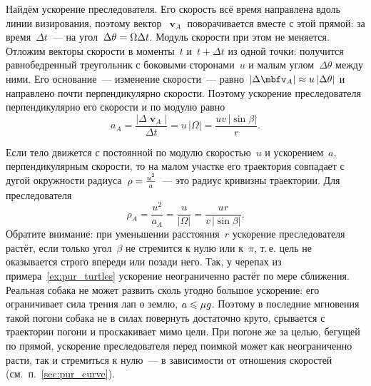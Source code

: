 \documentclass[../main.tex]{subfiles}
\begin{document}
Найдём ускорение преследователя. Его скорость всё время направлена вдоль линии
визирования, поэтому вектор~$\mbfv_A$ поворачивается вместе с этой прямой: за время~$\Delta t$~--- на угол~$\Delta\theta \hm= \Omega\Delta t$. Модуль скорости при этом не
меняется. Отложим векторы скорости в моменты~$t$ и~$t + \Delta t$ из одной точки:
получится равнобедренный треугольник с боковыми сторонами~$u$ и малым углом~$\Delta\theta$ между ними. Его основание~--- изменение скорости~--- равно~$|\Delta\mbfv_A| \hm\approx u\,|\Delta\theta|$ и направлено почти перпендикулярно
скорости. Поэтому ускорение преследователя перпендикулярно его скорости и по модулю
равно
\[
a_A = \frac{|\Delta\mbfv_A|}{\Delta t} = u\,|\Omega| = \frac{uv\,|\sin\beta|}{r}.
\]

Если тело движется с постоянной по модулю скоростью~$u$ и ускорением~$a$,
перпендикулярным скорости, то на малом участке его траектория совпадает с дугой
окружности радиуса~$\rho \hm= \frac{u^2}{a}$~--- это радиус кривизны траектории.
Для преследователя
\[
\rho_A = \frac{u^2}{a_A} = \frac{u}{|\Omega|} = \frac{ur}{v\,|\sin\beta|}.
\]
Обратите внимание: при уменьшении расстояния~$r$ ускорение преследователя растёт,
если только угол~$\beta$ не стремится к нулю или к~$\pi$, т.\,е. цель не оказывается
строго впереди или позади него. Так, у черепах из примера~\ref{ex:pur_turtles}
ускорение неограниченно растёт по мере сближения. Реальная собака не может развить
сколь угодно большое ускорение: его ограничивает сила трения лап о землю,
$a \hm\leqslant \mu g$. Поэтому в последние мгновения такой погони собака не в силах
повернуть достаточно круто, срывается с траектории погони и проскакивает мимо цели.
При погоне же за целью, бегущей по прямой, ускорение преследователя перед поимкой
может как неограниченно расти, так и стремиться к нулю~--- в зависимости от
отношения скоростей (см.~п.~\ref{sec:pur_curve}).
\end{document}
